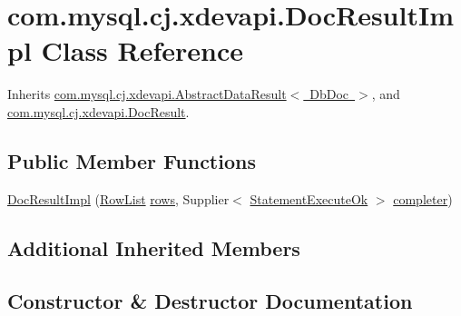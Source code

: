 \hypertarget{classcom_1_1mysql_1_1cj_1_1xdevapi_1_1_doc_result_impl}{}\section{com.\+mysql.\+cj.\+xdevapi.\+Doc\+Result\+Impl Class Reference}
\label{classcom_1_1mysql_1_1cj_1_1xdevapi_1_1_doc_result_impl}


Inherits \mbox{\hyperlink{classcom_1_1mysql_1_1cj_1_1xdevapi_1_1_abstract_data_result}{com.\+mysql.\+cj.\+xdevapi.\+Abstract\+Data\+Result$<$ Db\+Doc $>$}}, and \mbox{\hyperlink{interfacecom_1_1mysql_1_1cj_1_1xdevapi_1_1_doc_result}{com.\+mysql.\+cj.\+xdevapi.\+Doc\+Result}}.

\subsection*{Public Member Functions}
\begin{DoxyCompactItemize}
\item 
\mbox{\hyperlink{classcom_1_1mysql_1_1cj_1_1xdevapi_1_1_doc_result_impl_af03d5dc32ec7b79ec200a83c81cebef4}{Doc\+Result\+Impl}} (\mbox{\hyperlink{interfacecom_1_1mysql_1_1cj_1_1result_1_1_row_list}{Row\+List}} \mbox{\hyperlink{classcom_1_1mysql_1_1cj_1_1xdevapi_1_1_abstract_data_result_ae04b2bf0af10423f89abe996549946f9}{rows}}, Supplier$<$ \mbox{\hyperlink{classcom_1_1mysql_1_1cj_1_1protocol_1_1x_1_1_statement_execute_ok}{Statement\+Execute\+Ok}} $>$ \mbox{\hyperlink{classcom_1_1mysql_1_1cj_1_1xdevapi_1_1_abstract_data_result_aec36caa2d5404a5748add97ebab8bc1e}{completer}})
\end{DoxyCompactItemize}
\subsection*{Additional Inherited Members}


\subsection{Constructor \& Destructor Documentation}
\mbox{\label{classcom_1_1mysql_1_1cj_1_1xdevapi_1_1_doc_result_impl_af03d5dc32ec7b79ec200a83c81cebef4}} 
